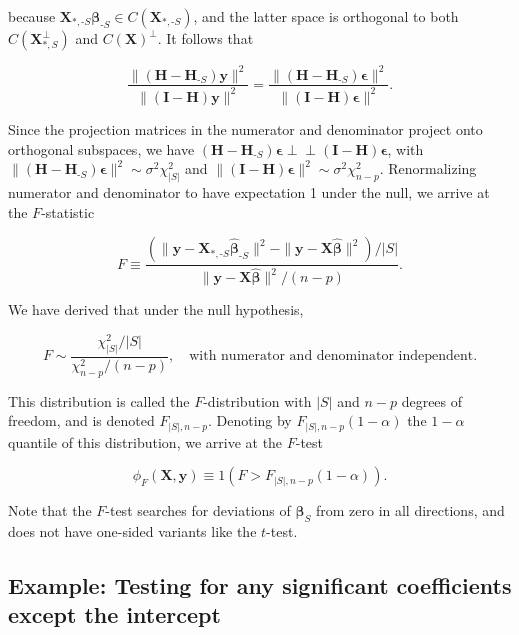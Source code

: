 \documentclass[
  11pt,
  letterpaper,
  oneside]{book}
\theoremstyle{plain}
\theoremstyle{plain}
\theoremstyle{definition}
\theoremstyle{definition}
\theoremstyle{plain}
\theoremstyle{remark}
\begin{document}
because
\(\boldsymbol{X}_{*, \text{-}S} \boldsymbol{\beta}_{\text{-}S} \in C(\boldsymbol{X}_{*, \text{-}S})\),
and the latter space is orthogonal to both
\(C(\boldsymbol{X}_{*,S}^\perp)\) and \(C(\boldsymbol{X})^\perp\). It
follows that

\[
\frac{\|(\boldsymbol{H} - \boldsymbol{H}_{\text{-}S}) \boldsymbol{y}\|^2}{\|(\boldsymbol{I} - \boldsymbol{H}) \boldsymbol{y}\|^2} = \frac{\|(\boldsymbol{H} - \boldsymbol{H}_{\text{-}S}) \boldsymbol{\epsilon}\|^2}{\|(\boldsymbol{I} - \boldsymbol{H}) \boldsymbol{\epsilon}\|^2}.
\]

Since the projection matrices in the numerator and denominator project
onto orthogonal subspaces, we have
\((\boldsymbol{H} - \boldsymbol{H}_{\text{-}S}) \boldsymbol{\epsilon} \perp\!\!\!\perp (\boldsymbol{I} - \boldsymbol{H}) \boldsymbol{\epsilon}\),
with
\(\|(\boldsymbol{H} - \boldsymbol{H}_{\text{-}S}) \boldsymbol{\epsilon}\|^2 \sim \sigma^2 \chi^2_{|S|}\)
and
\(\|(\boldsymbol{I} - \boldsymbol{H}) \boldsymbol{\epsilon}\|^2 \sim \sigma^2 \chi^2_{n-p}\).
Renormalizing numerator and denominator to have expectation 1 under the
null, we arrive at the \(F\)-statistic

\[
F \equiv \frac{(\|\boldsymbol{y} - \boldsymbol{X}_{*, \text{-}S} \boldsymbol{\widehat{\beta}}_{\text{-}S}\|^2 - \|\boldsymbol{y} - \boldsymbol{X} \boldsymbol{\widehat{\beta}}\|^2)/|S|}{\|\boldsymbol{y} - \boldsymbol{X} \boldsymbol{\widehat{\beta}}\|^2/(n-p)}.
\]

We have derived that under the null hypothesis,

\[
F \sim \frac{\chi^2_{|S|}/|S|}{\chi^2_{n-p}/(n-p)}, \quad \text{with numerator and denominator independent.}
\]

This distribution is called the \(F\)-distribution with \(|S|\) and
\(n-p\) degrees of freedom, and is denoted \(F_{|S|, n-p}\). Denoting by
\(F_{|S|, n-p}(1-\alpha)\) the \(1-\alpha\) quantile of this
distribution, we arrive at the \(F\)-test

\[
\phi_F(\boldsymbol{X}, \boldsymbol{y}) \equiv 1(F > F_{|S|, n-p}(1-\alpha)).
\]

Note that the \(F\)-test searches for deviations of
\(\boldsymbol{\beta}_{S}\) from zero in all directions, and does not
have one-sided variants like the \(t\)-test.

\hypertarget{example-testing-for-any-significant-coefficients-except-the-intercept}{%
\subsection{Example: Testing for any significant coefficients except the
intercept}\label{example-testing-for-any-significant-coefficients-except-the-intercept}}
\end{document}
